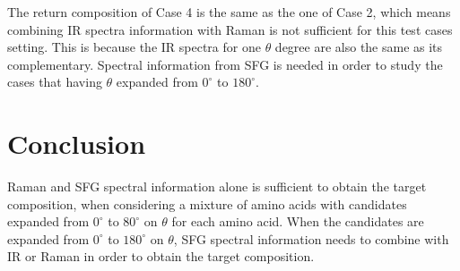 The return composition of Case 4 is the same as the one of Case 2, which means combining IR spectra information with Raman is not sufficient for this test cases setting. This is because the IR spectra for one $\theta$ degree are also the same as its complementary. Spectral information from SFG is needed in order to study the cases that having $\theta$ expanded from $0^{\circ}$ to $180^{\circ}$. \\


\section{Conclusion}
Raman and SFG spectral information alone is sufficient to obtain the target composition, when considering a mixture of amino acids with candidates expanded from $0^{\circ}$ to $80^{\circ}$ on $\theta$ for each amino acid. When the candidates are expanded from $0^{\circ}$ to $180^{\circ}$ on $\theta$, SFG spectral information needs to combine with IR or Raman in order to obtain the target composition. \\
